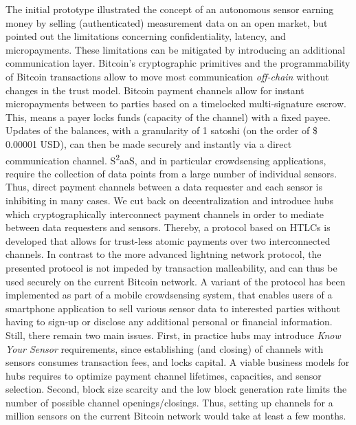 The initial prototype illustrated the concept of an autonomous sensor earning money by selling (authenticated) measurement data on an open market, but pointed out the limitations concerning confidentiality, latency, and micropayments. These limitations can be mitigated by introducing an additional communication layer. Bitcoin's cryptographic primitives and the programmability of Bitcoin transactions allow to move most communication \emph{off-chain} without changes in the trust model. Bitcoin payment channels allow for instant micropayments between to parties based on a timelocked multi-signature escrow. This, means a payer locks funds (capacity of the channel) with a fixed payee. Updates of the balances, with a granularity of 1 satoshi (on the order of \$ 0.00001 USD), can then be made securely and instantly via a direct communication channel. S\textsuperscript{2}aaS, and in particular crowdsensing applications, require the collection of data points from a large number of individual sensors. Thus, direct payment channels between a data requester and each sensor is inhibiting in many cases. We cut back on decentralization and introduce hubs which cryptographically interconnect payment channels in order to mediate between data requesters and sensors. Thereby, a protocol based on \ac{HTLC}s is developed that allows for trust-less atomic payments over two interconnected channels. In contrast to the more advanced lightning network protocol, the presented protocol is not impeded by transaction malleability, and can thus be used securely on the current Bitcoin network. A variant of the protocol has been implemented as part of a mobile crowdsensing system, that enables users of a smartphone application to sell various sensor data to interested parties without having to sign-up or disclose any additional personal or financial information. Still, there remain two main issues. First, in practice hubs may introduce \emph{Know Your Sensor} requirements, since establishing (and closing) of channels with sensors consumes transaction fees, and locks capital. A viable business models for hubs requires to optimize payment channel lifetimes, capacities, and sensor selection. Second, block size scarcity and the low block generation rate limits the number of possible channel openings/closings. Thus, setting up channels for a million sensors on the current Bitcoin network would take at least a few months.

